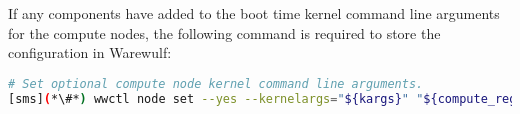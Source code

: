 \noindent If any components have added to the boot time kernel command line arguments for the compute nodes,
the following command is required to store the configuration in Warewulf:
\begin{lstlisting}[language=bash,keywords={},upquote=true,basicstyle=\footnotesize\ttfamily]
# Set optional compute node kernel command line arguments.
[sms](*\#*) wwctl node set --yes --kernelargs="${kargs}" "${compute_regex}"
\end{lstlisting}
